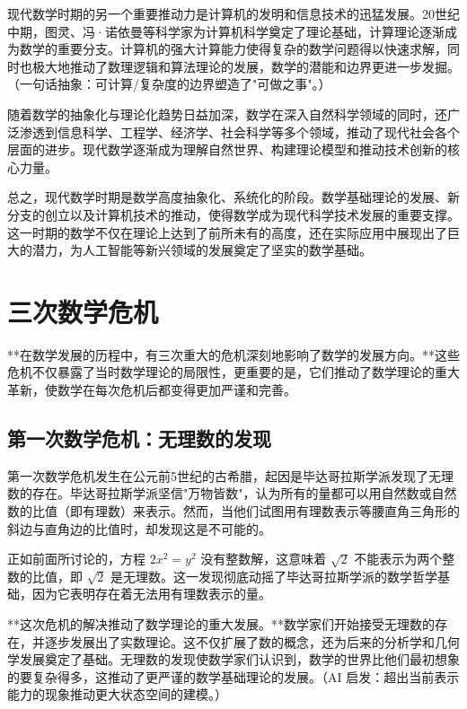 现代数学时期的另一个重要推动力是计算机的发明和信息技术的迅猛发展。20世纪中期，图灵、冯·诺依曼等科学家为计算机科学奠定了理论基础，计算理论逐渐成为数学的重要分支。计算机的强大计算能力使得复杂的数学问题得以快速求解，同时也极大地推动了数理逻辑和算法理论的发展，数学的潜能和边界更进一步发掘。{（一句话抽象：可计算/复杂度的边界塑造了"可做之事"。）}

随着数学的抽象化与理论化趋势日益加深，数学在深入自然科学领域的同时，还广泛渗透到信息科学、工程学、经济学、社会科学等多个领域，推动了现代社会各个层面的进步。现代数学逐渐成为理解自然世界、构建理论模型和推动技术创新的核心力量。


总之，现代数学时期是数学高度抽象化、系统化的阶段。数学基础理论的发展、新分支的创立以及计算机技术的推动，使得数学成为现代科学技术发展的重要支撑。这一时期的数学不仅在理论上达到了前所未有的高度，还在实际应用中展现出了巨大的潜力，为人工智能等新兴领域的发展奠定了坚实的数学基础。

\section{三次数学危机}


**在数学发展的历程中，有三次重大的危机深刻地影响了数学的发展方向。**这些危机不仅暴露了当时数学理论的局限性，更重要的是，它们推动了数学理论的重大革新，使数学在每次危机后都变得更加严谨和完善。

\subsection{第一次数学危机：无理数的发现}


第一次数学危机发生在公元前5世纪的古希腊，起因是毕达哥拉斯学派发现了无理数的存在。毕达哥拉斯学派坚信"万物皆数"，认为所有的量都可以用自然数或自然数的比值（即有理数）来表示。然而，当他们试图用有理数表示等腰直角三角形的斜边与直角边的比值时，却发现这是不可能的。

正如前面所讨论的，方程 $2x^2 = y^2$ 没有整数解，这意味着 $\sqrt{2}$ 不能表示为两个整数的比值，即 $\sqrt{2}$ 是无理数。这一发现彻底动摇了毕达哥拉斯学派的数学哲学基础，因为它表明存在着无法用有理数表示的量。

**这次危机的解决推动了数学理论的重大发展。**数学家们开始接受无理数的存在，并逐步发展出了实数理论。这不仅扩展了数的概念，还为后来的分析学和几何学发展奠定了基础。无理数的发现使数学家们认识到，数学的世界比他们最初想象的要复杂得多，这推动了更严谨的数学基础理论的发展。{（AI 启发：超出当前表示能力的现象推动更大状态空间的建模。）}

